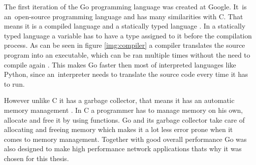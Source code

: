 The first iteration of the Go programming language was created at Google. It~is an~open-source programming language and has many similarities with C. That means it is a compiled language and a statically typed language \cite{Donovan2016}. In a statically typed language a variable has to have a type assigned to it before the compilation process. As can be seen in figure \ref{img:compiler} a compiler translates the source program into an executable, which can be ran multiple times without the need to compile again \cite{Aho2006}. This makes Go faster then most of interpreted languages like Python, since an~interpreter needs to translate the source code every time it has to run.


However unlike C it has a garbage collector, that means it has an automatic memory management \cite{Donovan2016}. In C a programmer has to manage memory on his own, allocate and free it by using functions. Go and its garbage collector take care of allocating and freeing memory which makes it a lot less error prone when it comes to memory management. Together with good overall performance Go was also designed to make high performance network applications thats why it was chosen for this thesis.
